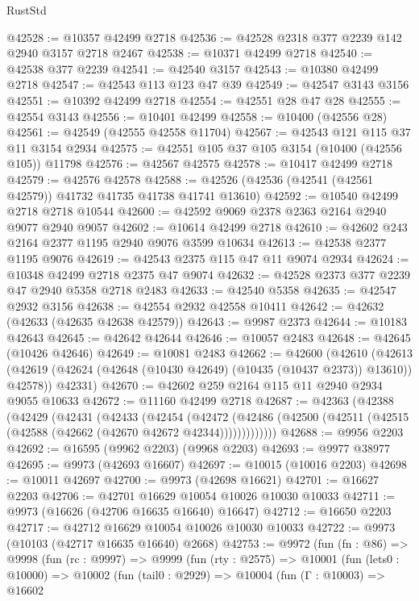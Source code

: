 \begin{lexlean}{RustStd}
\begin{coremodule}
@42528 := @10357 @42499 @2718
@42536 := @42528 @2318 @377 @2239 @142 @2940 @3157 @2718 @2467
@42538 := @10371 @42499 @2718
@42540 := @42538 @377 @2239
@42541 := @42540 @3157
@42543 := @10380 @42499 @2718
@42547 := @42543 @113 @123 @47 @39
@42549 := @42547 @3143 @3156
@42551 := @10392 @42499 @2718
@42554 := @42551 @28 @47 @28
@42555 := @42554 @3143
@42556 := @10401 @42499
@42558 := @10400 (@42556 @28)
@42561 := @42549 (@42555 @42558 @11704)
@42567 := @42543 @121 @115 @37 @11 @3154 @2934
@42575 := @42551 @105 @37 @105 @3154 (@10400 (@42556 @105)) @11798
@42576 := @42567 @42575
@42578 := @10417 @42499 @2718
@42579 := @42576 @42578
@42588 := @42526 (@42536 (@42541 (@42561 @42579)) @41732 @41735 @41738 @41741 @13610)
@42592 := @10540 @42499 @2718 @2718 @10544
@42600 := @42592 @9069 @2378 @2363 @2164 @2940 @9077 @2940 @9057
@42602 := @10614 @42499 @2718
@42610 := @42602 @243 @2164 @2377 @1195 @2940 @9076 @3599 @10634
@42613 := @42538 @2377 @1195 @9076
@42619 := @42543 @2375 @115 @47 @11 @9074 @2934
@42624 := @10348 @42499 @2718 @2375 @47 @9074
@42632 := @42528 @2373 @377 @2239 @47 @2940 @5358 @2718 @2483
@42633 := @42540 @5358
@42635 := @42547 @2932 @3156
@42638 := @42554 @2932 @42558 @10411
@42642 := @42632 (@42633 (@42635 @42638 @42579))
@42643 := @9987 @2373
@42644 := @10183 @42643
@42645 := @42642 @42644
@42646 := @10057 @2483
@42648 := @42645 (@10426 @42646)
@42649 := @10081 @2483
@42662 := @42600
    (@42610
      (@42613 (@42619 (@42624 (@42648 (@10430 @42649) (@10435 (@10437 @2373)) @13610)) @42578))
      @42331)
@42670 := @42602 @259 @2164 @115 @11 @2940 @2934 @9055 @10633
@42672 := @11160 @42499 @2718
@42687 := @42363
    (@42388
      (@42429
        (@42431
          (@42433
            (@42454
              (@42472
                (@42486 (@42500 (@42511 (@42515 (@42588 (@42662 (@42670 @42672 @42344)))))))))))))
@42688 := @9956 @2203
@42692 := @16595 (@9962 @2203) (@9968 @2203)
@42693 := @9977 @38977
@42695 := @9973 (@42693 @16607)
@42697 := @10015 (@10016 @2203)
@42698 := @10011 @42697
@42700 := @9973 (@42698 @16621)
@42701 := @16627 @2203
@42706 := @42701 @16629 @10054 @10026 @10030 @10033
@42711 := @9973 (@16626 (@42706 @16635 @16640) @16647)
@42712 := @16650 @2203
@42717 := @42712 @16629 @10054 @10026 @10030 @10033
@42722 := @9973 (@10103 (@42717 @16635 @16640) @2668)
@42753 := @9972
    (fun (fn : @86) =>
    @9998
      (fun (rc : @9997) =>
      @9999
        (fun (rty : @2575) =>
        @10001
          (fun (lets0 : @10000) =>
          @10002
            (fun (tail0 : @2929) =>
            @10004
              (fun (Γ : @10003) =>
              @16602

\end{coremodule}
\end{lexlean}
